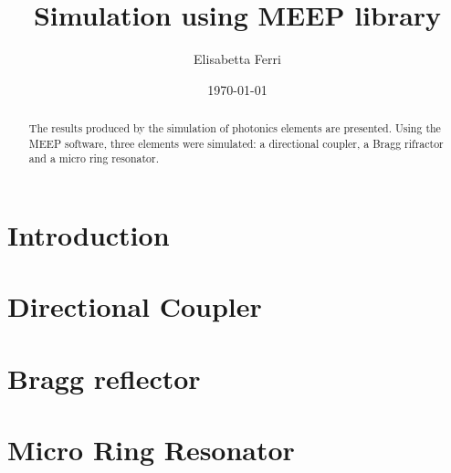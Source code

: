 \documentclass[a4paper]{article}
\title{Simulation using MEEP library}
\author{Elisabetta Ferri}
\date{\today}
\begin{document}
\maketitle
 
\begin{abstract}

The results produced by the simulation of photonics elements are presented. Using the MEEP software, three elements were simulated: a directional coupler, a Bragg rifractor and a micro ring resonator.

\end{abstract}

\section{Introduction}


\section{Directional Coupler}


\section{Bragg reflector}


\section{Micro Ring Resonator}


\printbibliography
{}
\end{document}
